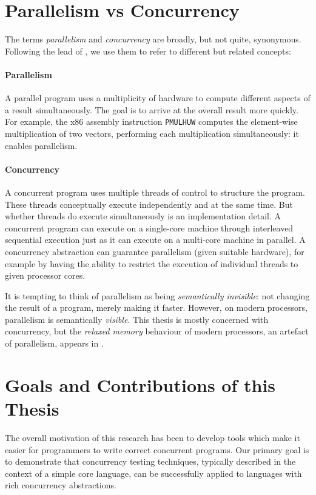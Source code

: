 \section{Parallelism vs Concurrency}
\label{sec:intro-parconc}

The terms \emph{parallelism} and \emph{concurrency} are broadly, but
not quite, synonymous.  Following the lead of \cite{peytonjones1996},
we use them to refer to different but related concepts:

\paragraph{Parallelism}
A parallel program uses a multiplicity of hardware to compute
different aspects of a result simultaneously.  The goal is to arrive
at the overall result more quickly.  For example, the x86 assembly
instruction \verb#PMULHUW# computes the element-wise multiplication of
two vectors, performing each multiplication simultaneously: it enables
parallelism.

\paragraph{Concurrency}
A concurrent program uses multiple threads of control to structure the
program.  These threads conceptually execute independently and at the
same time.  But whether threads do execute simultaneously is an
implementation detail.  A concurrent program can execute on a
single-core machine through interleaved sequential execution just as
it can execute on a multi-core machine in parallel.  A concurrency
abstraction can guarantee parallelism (given suitable hardware), for
example by having the ability to restrict the execution of individual
threads to given processor cores.

It is tempting to think of parallelism as being \emph{semantically
  invisible}: not changing the result of a program, merely making it
faster.  However, on modern processors, parallelism is semantically
\emph{visible}.  This thesis is mostly concerned with concurrency, but
the \emph{relaxed memory} behaviour of modern processors, an artefact
of parallelism, appears in .

\section{Goals and Contributions of this Thesis}
\label{sec:intro-contributions}

The overall motivation of this research has been to develop tools
which make it easier for programmers to write correct concurrent
programs.  Our primary goal is to demonstrate that concurrency testing
techniques, typically described in the context of a simple core
language, can be successfully applied to languages with rich
concurrency abstractions.


